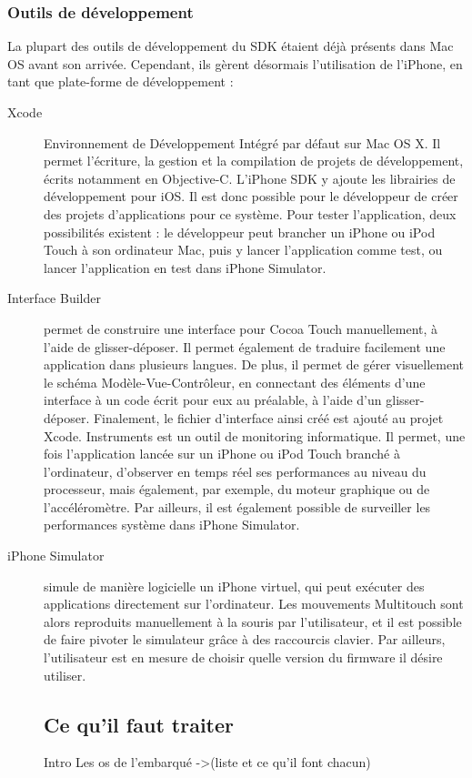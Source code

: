 \documentclass[a4paper,12pt]{report}
\begin{document}
\begin{onehalfspace}
\subsection*{Outils de développement}
La plupart des outils de développement du SDK étaient déjà présents dans Mac OS avant son arrivée. Cependant, ils gèrent désormais l'utilisation de l'iPhone, en tant que plate-forme de développement :
\begin{description}
\item[Xcode] Environnement de Développement Intégré par défaut sur Mac OS X. Il permet l'écriture, la gestion et la compilation de projets de développement, écrits notamment en Objective-C. L'iPhone SDK y ajoute les librairies de développement pour iOS. Il est donc possible pour le développeur de créer des projets d'applications pour ce système. Pour tester l'application, deux possibilités existent : le développeur peut brancher un iPhone ou iPod Touch à son ordinateur Mac, puis y lancer l'application comme test, ou lancer l'application en test dans iPhone Simulator.
\item[Interface Builder] permet de construire une interface pour Cocoa Touch manuellement, à l'aide de glisser-déposer. Il permet également de traduire facilement une application dans plusieurs langues. De plus, il permet de gérer visuellement le schéma Modèle-Vue-Contrôleur, en connectant des éléments d'une interface à un code écrit pour eux au préalable, à l'aide d'un glisser-déposer. Finalement, le fichier d'interface ainsi créé est ajouté au projet Xcode.
Instruments est un outil de monitoring informatique. Il permet, une fois l'application lancée sur un iPhone ou iPod Touch branché à l'ordinateur, d'observer en temps réel ses performances au niveau du processeur, mais également, par exemple, du moteur graphique ou de l'accéléromètre. Par ailleurs, il est également possible de surveiller les performances système dans iPhone Simulator.
\item[iPhone Simulator] simule de manière logicielle un iPhone virtuel, qui peut exécuter des applications directement sur l'ordinateur. Les mouvements Multitouch sont alors reproduits manuellement à la souris par l'utilisateur, et il est possible de faire pivoter le simulateur grâce à des raccourcis clavier. Par ailleurs, l'utilisateur est en mesure de choisir quelle version du firmware il désire utiliser.


\chapter*{Ce qu'il faut traiter}
Intro
  Les os de l'embarqué
  ->(liste et ce qu'il font chacun)


\end{description}
\end{onehalfspace}
\end{document}

